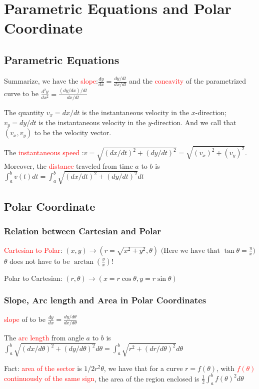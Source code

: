 \documentclass[12pt]{article}
\theoremstyle{definition}
\theoremstyle{definition}
\theoremstyle{remark}
\theoremstyle{definition}
\theoremstyle{definition}
\theoremstyle{definition}
\begin{document}
\section{Parametric Equations and Polar Coordinate}
\subsection{Parametric Equations}

Summarize, we have the \textcolor{red}{slope}:$\frac{dy}{dx}=\frac{dy/dt}{dx/dt}$
and the \textcolor{red}{concavity} of the parametrized curve to be
$\frac{d^2y}{dx^2}=\frac{(dy/dx)/dt}{dx/dt}$

The quantity $v_x = dx/dt$ is the instantaneous velocity in the $x$-direction; $v_y = dy/dt$ is the
instantaneous velocity in the $y$-direction.
And we call that $(v_x,v_y)$ to be the velocity vector.

The \textcolor{red}{instantaneous speed} :$v = \sqrt{(dx/dt)^2 + (dy/dt)^2} =\sqrt{(v_x)^2 + (v_y)^2}$.\\


Moreover, the \textcolor{red}{distance} traveled from time $a$ to $b$ is $\int^b_a v(t) dt = \int_a^b \sqrt{(dx/dt)^2 + (dy/dt)^2} dt$

\subsection{Polar Coordinate}


\subsubsection{Relation between Cartesian and Polar}

\textcolor{red}{Cartesian to Polar}: $(x,y) \to (r= \sqrt{x^2 + y^2}, \theta) \text{ (Here we have that } \tan \theta = \frac{y}{x} \text{)}$
$\theta$ does not have to be $\arctan(\frac{y}{x})$!

Polar to Cartesian: $(r,\theta) \to (x=r \cos \theta, y=r \sin \theta)$

\subsubsection{Slope, Arc length and Area in Polar Coordinates}
\textcolor{red}{slope} of to be 
$\frac{dy}{dx}=\frac{dy/d\theta}{dx/d\theta}$

The \textcolor{red}{arc length} from angle $a$ to $b$ is $\int_a^b \sqrt{(dx/d\theta)^2 + (dy/d\theta)^2} d\theta=\int_a^b \sqrt{r^2 + (dr/d\theta)^2} d\theta$

Fact: \textcolor{red}{area of the sector} is $1/2 r^2 \theta$, we have that for a curve $r = f(\theta)$, with \textcolor{red}{$f(\theta)$ continuously of the same sign}, the area of the region enclosed is $\frac{1}{2}\int^{b}_{a}f(\theta)^2 d\theta$
\end{document}

